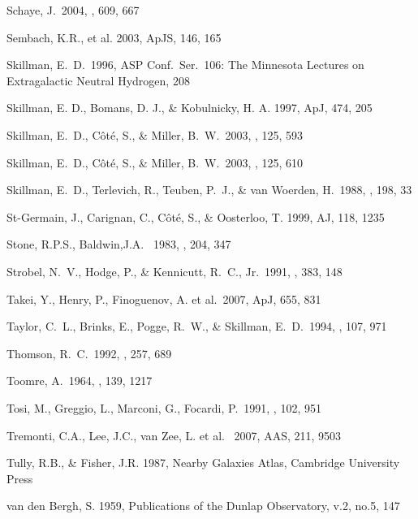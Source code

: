 \documentclass[12pt,preprint]{emulateapj}
\begin{document}
\begin{thebibliography}{}
Schaye, J.\ 2004, \apj, 609, 667 

Sembach, K.R., et al. 2003, ApJS, 146, 165

Skillman, E.~D.\ 1996, ASP Conf.~Ser.~106: 
The Minnesota Lectures on Extragalactic Neutral Hydrogen, 208 

Skillman, E. D., Bomans, D. J., \& Kobulnicky, H. A.  
1997, ApJ, 474, 205

Skillman, E.~D., C{\^o}t{\'e}, S., \& Miller, B.~W.\ 2003, \aj, 125, 593

Skillman, E.~D., C{\^o}t{\'e}, S., \& Miller, B.~W.\ 2003, \aj, 125, 610 

Skillman, E.~D., Terlevich, R., Teuben, P.~J., \& van Woerden, H.\ 1988, \aap, 198, 33 

St-Germain, J., Carignan, C., C\^ot\'e, S., \& Oosterloo, T. 1999, AJ, 118, 1235

Stone, R.P.S., Baldwin,J.A. \ 1983, \mnras, 204, 347

Strobel, N.~V., Hodge, P., \& Kennicutt, R.~C., Jr.\ 1991, \apj, 383, 148 

Takei, Y., Henry, P., Finoguenov, A. et al.\ 2007, ApJ, 655, 831 

Taylor, C.~L., Brinks, E., Pogge, R.~W., \& Skillman, E.~D.\ 1994, \aj, 107, 971 

Thomson, R.~C.\ 1992, \mnras, 257, 689 

Toomre, A.\ 1964, \apj, 139, 1217 

Tosi, M., Greggio, L., Marconi, G., Focardi, P.\ 1991, \aj, 102, 951 

Tremonti, C.A., Lee, J.C., van Zee, L. et al. \ 2007, AAS, 211, 9503

Tully, R.B., \& Fisher, J.R. 1987, Nearby Galaxies Atlas, Cambridge
University Press
 
van den Bergh, S. 1959, Publications of the Dunlap Observatory, v.2, no.5, 147


\end{thebibliography}
\end{document}
